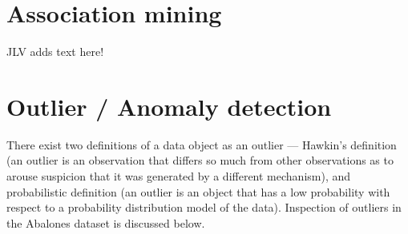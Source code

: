 \documentclass[10pt, paper=a4]{article}
\begin{document}
\newpage
\section{Association mining}
\label{sec:association}

{\color{red} JLV adds text here!}

\section{Outlier / Anomaly detection}
\label{sec:detection}


There exist two definitions of a data object as an outlier --- Hawkin's
definition (an outlier is an observation that differs so much from other
observations as to arouse suspicion that it was generated by a different
mechanism), and probabilistic definition (an outlier is an object that has a low
probability with respect to a probability distribution model of the data).
Inspection of outliers in the Abalones dataset is discussed below.
\end{document}
